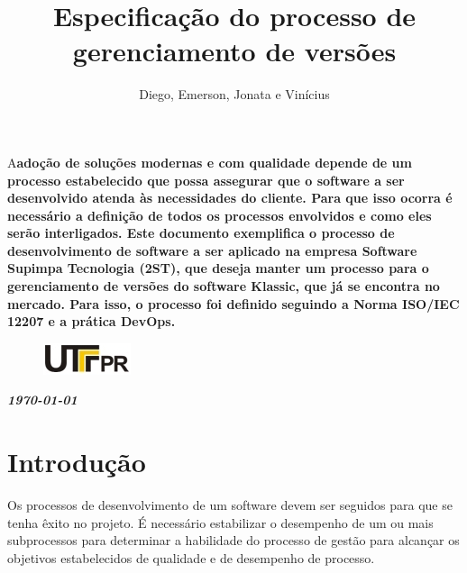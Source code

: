 \documentclass[	DIV=calc,%
							paper=a4,%
							fontsize=12pt,%
							onecolumn]{scrartcl}	 					%
\title{Especificação do processo de gerenciamento de versões}					%
\author{Diego, Emerson, Jonata e Vinícius }  	%
\date{}																				%
\newcommand{\initial}[1]{%
     \lettrine[lines=3,lhang=0.3,nindent=0em]{
     				\color{DarkGoldenrod}
     				{\textsf{#1}}}{}}
\begin{document}
\maketitle
\thispagestyle{fancy} 	
\thispagestyle{empty}		%




\initial{A}\textbf{adoção de soluções modernas e com qualidade depende de um processo estabelecido que possa assegurar que o software a
ser desenvolvido atenda às necessidades do cliente. Para que isso ocorra é necessário a
definição de todos os processos envolvidos e como eles serão interligados.
Este documento exemplifica o processo de desenvolvimento de software a ser aplicado 
na empresa Software Supimpa Tecnologia (2ST), que deseja manter um processo para o gerenciamento de versões do software Klassic, que já se encontra no mercado. Para isso, o processo foi definido seguindo a Norma ISO/IEC 12207 e a prática DevOps. }

\begin{figure}
	\centering
	\includegraphics{utfpr}
\end{figure}

\vspace{3cm}
\centerline{\textit{\textbf{\today}}}

\clearpage
    \renewcommand*\listfigurename{Lista de figuras}
\listoffigures

\renewcommand*\listtablename{Lista de tabelas}
\listoftables




\clearpage
\renewcommand{\contentsname}{Sumário}
\tableofcontents
\clearpage

\section{Introdução}

Os processos de desenvolvimento de um software devem ser seguidos para que se tenha êxito no projeto. É necessário 
estabilizar o desempenho de um ou mais subprocessos para determinar a habilidade do processo de gestão para alcançar os objetivos estabelecidos de qualidade e de desempenho de processo.
\end{document}
